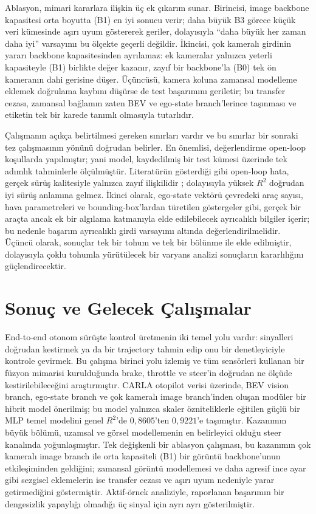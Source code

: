 \documentclass[conference]{IEEEtran}
\begin{document}
Ablasyon, mimari kararlara ilişkin üç ek çıkarım sunar. Birincisi, image backbone kapasitesi orta boyutta (B1) en iyi sonucu verir; daha büyük B3 görece küçük veri kümesinde aşırı uyum göstererek geriler, dolayısıyla ``daha büyük her zaman daha iyi'' varsayımı bu ölçekte geçerli değildir. İkincisi, çok kameralı girdinin yararı backbone kapasitesinden ayrılamaz: ek kameralar yalnızca yeterli kapasiteyle (B1) birlikte değer kazanır, zayıf bir backbone'la (B0) tek ön kameranın dahi gerisine düşer. Üçüncüsü, kamera koluna zamansal modelleme eklemek doğrulama kaybını düşürse de test başarımını geriletir; bu transfer cezası, zamansal bağlamın zaten BEV ve ego-state branch'lerince taşınması ve etiketin tek bir karede tanımlı olmasıyla tutarlıdır.

Çalışmanın açıkça belirtilmesi gereken sınırları vardır ve bu sınırlar bir sonraki tez çalışmasının yönünü doğrudan belirler. En önemlisi, değerlendirme open-loop koşullarda yapılmıştır; yani model, kaydedilmiş bir test kümesi üzerinde tek adımlık tahminlerle ölçülmüştür. Literatürün gösterdiği gibi open-loop hata, gerçek sürüş kalitesiyle yalnızca zayıf ilişkilidir \cite{CodevillaOffline18}; dolayısıyla yüksek $R^2$ doğrudan iyi sürüş anlamına gelmez. İkinci olarak, ego-state vektörü çevredeki araç sayısı, hava parametreleri ve bounding-box'lardan türetilen göstergeler gibi, gerçek bir araçta ancak ek bir algılama katmanıyla elde edilebilecek ayrıcalıklı bilgiler içerir; bu nedenle başarım ayrıcalıklı girdi varsayımı altında değerlendirilmelidir. Üçüncü olarak, sonuçlar tek bir tohum ve tek bir bölünme ile elde edilmiştir, dolayısıyla çoklu tohumla yürütülecek bir varyans analizi sonuçların kararlılığını güçlendirecektir.

\section{Sonuç ve Gelecek Çalışmalar}

End-to-end otonom sürüşte kontrol üretmenin iki temel yolu vardır: sinyalleri doğrudan kestirmek ya da bir trajectory tahmin edip onu bir denetleyiciyle kontrole çevirmek. Bu çalışma birinci yolu izlemiş ve tüm sensörleri kullanan bir füzyon mimarisi kurulduğunda brake, throttle ve steer'in doğrudan ne ölçüde kestirilebileceğini araştırmıştır. CARLA otopilot verisi üzerinde, BEV vision branch, ego-state branch ve çok kameralı image branch'inden oluşan modüler bir hibrit model önerilmiş; bu model yalnızca skaler özniteliklerle eğitilen güçlü bir MLP temel modelini genel $R^2$'de $0{,}8605$'ten $0{,}9221$'e taşımıştır. Kazanımın büyük bölümü, uzamsal ve görsel modellemenin en belirleyici olduğu steer kanalında yoğunlaşmıştır. Tek değişkenli bir ablasyon çalışması, bu kazanımın çok kameralı image branch ile orta kapasiteli (B1) bir görüntü backbone'unun etkileşiminden geldiğini; zamansal görüntü modellemesi ve daha agresif ince ayar gibi sezgisel eklemelerin ise transfer cezası ve aşırı uyum nedeniyle yarar getirmediğini göstermiştir. Aktif-örnek analiziyle, raporlanan başarımın bir dengesizlik yapaylığı olmadığı üç sinyal için ayrı ayrı gösterilmiştir.
\end{document}
